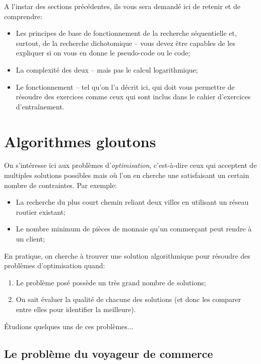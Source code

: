 \documentclass[12pt]{article}
\begin{document}
	\begin{MonRet}
		A l'instar des sections précédentes, ils vous sera demandé ici de retenir et de comprendre:
		\begin{itemize}
			\item Les principes de base de fonctionnement de la recherche séquentielle et, surtout, de la recherche dichotomique -- vous devez être capables de les expliquer si on vous en donne le pseudo-code ou le code;
			\item La complexité des deux -- mais pas le calcul logarithmique;
			\item Le fonctionnement -- tel qu'on l'a décrit ici, qui doit vous permettre de résoudre des exercices comme ceux qui sont inclus dans le cahier d'exercices d'entraînement.
		\end{itemize}
		
		
	\end{MonRet}
	\pagebreak
	
	\section{Algorithmes gloutons}
	On s'intéresse ici aux problèmes d'\textit{optimisation}, c'est-à-dire ceux qui acceptent de multiples solutions possibles mais où l'on en cherche une satisfaisant un certain nombre de contraintes. Par exemple:
	\begin{itemize}
		\item La recherche du plus court chemin reliant deux villes en utilisant un réseau routier existant;
		\item Le nombre minimum de pièces de monnaie qu'un commerçant peut rendre à un client;
	\end{itemize}
	
	En pratique, on cherche à trouver une solution algorithmique pour résoudre des problèmes d'optimisation quand:
	\begin{enumerate}
		\item Le problème posé possède un très grand nombre de solutions;
		\item On sait évaluer la qualité de chacune des solutions (et donc les comparer entre elles pour identifier la meilleure).
	\end{enumerate}
	
	Étudions quelques uns de ces problèmes...
	
	\subsection{Le problème du voyageur de commerce}
	
\end{document}
